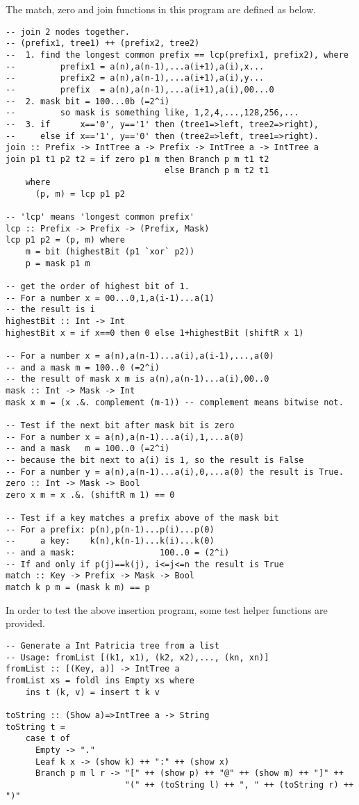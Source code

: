 \documentclass{article}
\begin{document}
The match, zero and join functions in this program are defined as below.
\begin{lstlisting}
-- join 2 nodes together.
-- (prefix1, tree1) ++ (prefix2, tree2)
--  1. find the longest common prefix == lcp(prefix1, prefix2), where
--         prefix1 = a(n),a(n-1),...a(i+1),a(i),x...
--         prefix2 = a(n),a(n-1),...a(i+1),a(i),y...
--         prefix  = a(n),a(n-1),...a(i+1),a(i),00...0
--  2. mask bit = 100...0b (=2^i)
--         so mask is something like, 1,2,4,...,128,256,...
--  3. if      x=='0', y=='1' then (tree1=>left, tree2=>right), 
--     else if x=='1', y=='0' then (tree2=>left, tree1=>right).
join :: Prefix -> IntTree a -> Prefix -> IntTree a -> IntTree a
join p1 t1 p2 t2 = if zero p1 m then Branch p m t1 t2
                                else Branch p m t2 t1 
    where
      (p, m) = lcp p1 p2

-- 'lcp' means 'longest common prefix'
lcp :: Prefix -> Prefix -> (Prefix, Mask)
lcp p1 p2 = (p, m) where
    m = bit (highestBit (p1 `xor` p2))
    p = mask p1 m

-- get the order of highest bit of 1.
-- For a number x = 00...0,1,a(i-1)...a(1)
-- the result is i
highestBit :: Int -> Int
highestBit x = if x==0 then 0 else 1+highestBit (shiftR x 1)

-- For a number x = a(n),a(n-1)...a(i),a(i-1),...,a(0)
-- and a mask m = 100..0 (=2^i)
-- the result of mask x m is a(n),a(n-1)...a(i),00..0
mask :: Int -> Mask -> Int
mask x m = (x .&. complement (m-1)) -- complement means bitwise not.

-- Test if the next bit after mask bit is zero
-- For a number x = a(n),a(n-1)...a(i),1,...a(0)
-- and a mask   m = 100..0 (=2^i)
-- because the bit next to a(i) is 1, so the result is False
-- For a number y = a(n),a(n-1)...a(i),0,...a(0) the result is True.
zero :: Int -> Mask -> Bool
zero x m = x .&. (shiftR m 1) == 0

-- Test if a key matches a prefix above of the mask bit
-- For a prefix: p(n),p(n-1)...p(i)...p(0)
--     a key:    k(n),k(n-1)...k(i)...k(0)
-- and a mask:                 100..0 = (2^i)
-- If and only if p(j)==k(j), i<=j<=n the result is True
match :: Key -> Prefix -> Mask -> Bool
match k p m = (mask k m) == p
\end{lstlisting}

In order to test the above insertion program, some test helper functions
are provided.

\begin{lstlisting}
-- Generate a Int Patricia tree from a list
-- Usage: fromList [(k1, x1), (k2, x2),..., (kn, xn)]
fromList :: [(Key, a)] -> IntTree a
fromList xs = foldl ins Empty xs where
    ins t (k, v) = insert t k v

toString :: (Show a)=>IntTree a -> String
toString t =
    case t of
      Empty -> "."
      Leaf k x -> (show k) ++ ":" ++ (show x)
      Branch p m l r -> "[" ++ (show p) ++ "@" ++ (show m) ++ "]" ++ 
                        "(" ++ (toString l) ++ ", " ++ (toString r) ++ ")"

\end{lstlisting}
\end{document}
